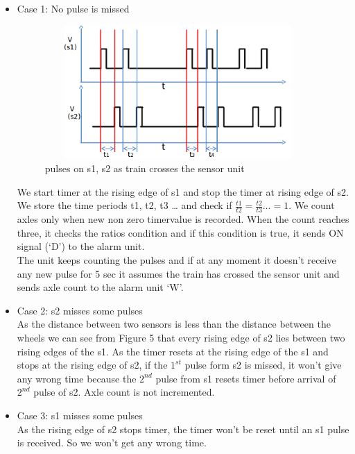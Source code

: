 \documentclass[aps,letterpaper,11pt]{article}
\begin{document}
\begin{itemize}
\item Case 1: No pulse is missed \\
\begin{figure}[H]
\begin{center}
\includegraphics[height = 2in,width=4in,angle=00]{figures/8w_no_miss.png}
\caption{\small pulses on s1, s2 as train crosses the sensor unit}
\end{center}
\end{figure}

We start timer at the rising edge of s1 and stop the timer at rising edge of
s2. We store the time periods t1, t2, t3 \ldots{} and check if $\frac{t1}{t2}
= \frac{t2}{t3} \ldots = 1 $. We count axles only when new non zero timervalue
is recorded. When the count reaches three, it checks the ratios condition and
if this condition is true, it sends ON signal (`D') to the alarm unit. \\
The unit keeps counting the pulses and if at any moment it doesn't receive any
new pulse for 5 sec it assumes the train has crossed the sensor unit and sends
axle count to the alarm unit `W'.

\item Case 2: s2 misses some pulses \\
As the distance between two sensors is less than the distance between the
wheels we can see from Figure 5 that every rising edge of s2 lies between two
rising edges of the s1. As the timer resets at the rising edge of the s1 and
stops at the rising edge of s2, if the $1^{st}$ pulse form s2 is missed, it
won't give any wrong time because the $2^{nd}$ pulse from s1 resets timer
before arrival of $2^{nd}$ pulse of s2.
Axle count is not incremented.

\item Case 3: s1 misses some pulses \\
As the rising edge of s2 stops timer, the timer won't be reset until an s1
pulse is received. So we won't get any wrong time.
\end{itemize}
\end{document}
